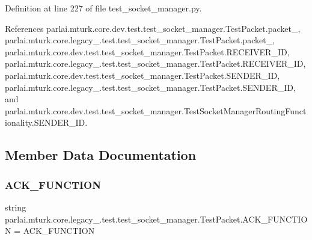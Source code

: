 Definition at line 227 of file test\+\_\+socket\+\_\+manager.\+py.



References parlai.\+mturk.\+core.\+dev.\+test.\+test\+\_\+socket\+\_\+manager.\+Test\+Packet.\+packet\+\_, parlai.\+mturk.\+core.\+legacy\+\_.\+test.\+test\+\_\+socket\+\_\+manager.\+Test\+Packet.\+packet\+\_, parlai.\+mturk.\+core.\+dev.\+test.\+test\+\_\+socket\+\_\+manager.\+Test\+Packet.\+R\+E\+C\+E\+I\+V\+E\+R\+\_\+\+ID, parlai.\+mturk.\+core.\+legacy\+\_.\+test.\+test\+\_\+socket\+\_\+manager.\+Test\+Packet.\+R\+E\+C\+E\+I\+V\+E\+R\+\_\+\+ID, parlai.\+mturk.\+core.\+dev.\+test.\+test\+\_\+socket\+\_\+manager.\+Test\+Packet.\+S\+E\+N\+D\+E\+R\+\_\+\+ID, parlai.\+mturk.\+core.\+legacy\+\_.\+test.\+test\+\_\+socket\+\_\+manager.\+Test\+Packet.\+S\+E\+N\+D\+E\+R\+\_\+\+ID, and parlai.\+mturk.\+core.\+dev.\+test.\+test\+\_\+socket\+\_\+manager.\+Test\+Socket\+Manager\+Routing\+Functionality.\+S\+E\+N\+D\+E\+R\+\_\+\+ID.



\subsection{Member Data Documentation}
\mbox{\label{classparlai_1_1mturk_1_1core_1_1legacy__2018_1_1test_1_1test__socket__manager_1_1TestPacket_af80f9930817932edf171298595ef4c5d}} 
\subsubsection{\texorpdfstring{A\+C\+K\+\_\+\+F\+U\+N\+C\+T\+I\+ON}{ACK\_FUNCTION}}
{\footnotesize\ttfamily string parlai.\+mturk.\+core.\+legacy\+\_.\+test.\+test\+\_\+socket\+\_\+manager.\+Test\+Packet.\+A\+C\+K\+\_\+\+F\+U\+N\+C\+T\+I\+ON = \textquotesingle{}A\+C\+K\+\_\+\+F\+U\+N\+C\+T\+I\+ON\textquotesingle{}\hspace{0.3cm}{\ttfamily [static]}}




